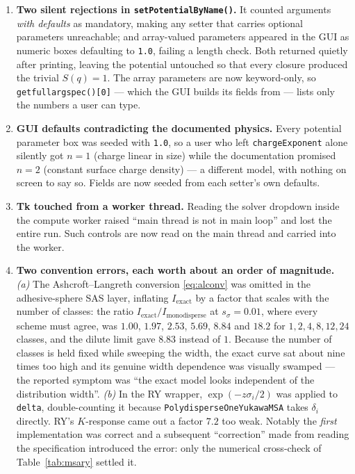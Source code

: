 \documentclass[11pt,a4paper]{article}
\newcommand{\code}[1]{\texttt{\hspace{0pt}#1}}
\begin{document}
\begin{enumerate}
\item \textbf{Two silent rejections in \code{setPotentialByName()}.} It
counted arguments \emph{with defaults} as mandatory, making any setter that
carries optional parameters unreachable; and array-valued parameters appeared
in the GUI as numeric boxes defaulting to \code{1.0}, failing a length check.
Both returned quietly after printing, leaving the potential untouched so that
every closure produced the trivial $S(q)=1$. The array parameters are now
keyword-only, so \code{getfullargspec()[0]} --- which the GUI builds its
fields from --- lists only the numbers a user can type.

\item \textbf{GUI defaults contradicting the documented physics.} Every
potential parameter box was seeded with \code{1.0}, so a user who left
\code{chargeExponent} alone silently got $n=1$ (charge linear in size) while
the documentation promised $n=2$ (constant surface charge density) --- a
different model, with nothing on screen to say so. Fields are now seeded from
each setter's own defaults.

\item \textbf{Tk touched from a worker thread.} Reading the solver dropdown
inside the compute worker raised ``main thread is not in main loop'' and lost
the entire run. Such controls are now read on the main thread and carried into
the worker.

\item \textbf{Two convention errors, each worth about an order of
magnitude.}
\emph{(a)} The Ashcroft--Langreth conversion \eqref{eq:alconv} was omitted in
the adhesive-sphere SAS layer, inflating $I_{\text{exact}}$ by a factor that
scales with the number of classes: the ratio
$I_{\text{exact}}/I_{\text{monodisperse}}$ at $s_\sigma=0.01$, where every
scheme must agree, was $1.00$, $1.97$, $2.53$, $5.69$, $8.84$ and $18.2$ for
$1,2,4,8,12,24$ classes, and the dilute limit gave $8.83$ instead of $1$.
Because the number of classes is held fixed while sweeping the width, the
exact curve sat about nine times too high and its genuine width dependence was
visually swamped --- the reported symptom was ``the exact model looks
independent of the distribution width''.
\emph{(b)} In the RY wrapper, $\exp(-z\sigma_i/2)$ was applied to
\code{delta}, double-counting it because
\code{PolydisperseOneYukawaMSA} takes $\delta_i$ directly. RY's $K$-response
came out a factor $7.2$ too weak. Notably the \emph{first} implementation was
correct and a subsequent ``correction'' made from reading the specification
introduced the error: only the numerical cross-check of
Table~\ref{tab:msary} settled it.
\end{enumerate}
\end{document}
